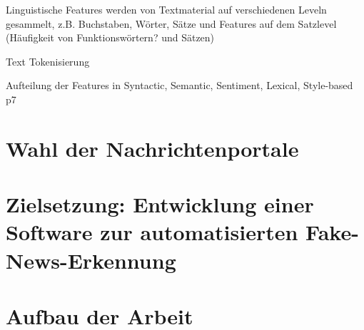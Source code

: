 Linguistische Features werden von Textmaterial auf verschiedenen Leveln gesammelt, z.B. Buchstaben, Wörter, Sätze 
und Features auf dem Satzlevel (Häufigkeit von Funktionswörtern? und Sätzen) \cite{secrypt17}

Text Tokenisierung \cite{Wagner:2010aa}

Aufteilung der Features in Syntactic, Semantic, Sentiment, Lexical, Style-based \cite{Sharma:2024}p7

\section{Wahl der Nachrichtenportale}
\label{sec:wahl_nachrichtenportale}

\section{Zielsetzung: Entwicklung einer Software zur automatisierten Fake-News-Erkennung}
\label{sec:zielsetzung}

\section{Aufbau der Arbeit}
\label{sec:aufbau}

